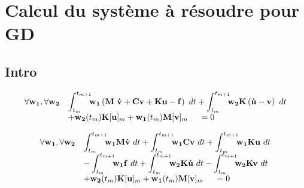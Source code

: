 \documentclass[12pt,a4paper]{report}
\begin{document}
\renewcommand{\contentsname}{Sommaire}
\tableofcontents

\chapter{Calcul du système à résoudre pour GD}
\section{Intro}
  
\begin{equation}
\begin{array}{r l}
	\forall \mathbf{w_1},\forall \mathbf{w_2}
	&\displaystyle\int_{t_m}^{t_{m+1}} \!\!\! 	\mathbf{w_1}
		\left(
		\mathbf{M}~\mathbf{\dot{v}} 
			+ \mathbf{C}\mathbf{v} 
			+ \mathbf{K}\mathbf{u}
			- \mathbf{f}
		\right)~dt
	  +\displaystyle\int_{t_m}^{t_{m+1}} \!\!\! 	\mathbf{w_2}
		\mathbf{K} 
			\left( \mathbf{\dot{u}} - \mathbf{v} 
			\right) ~dt
	\\
	  &+ \mathbf{w_2}(t_m) \mathbf{K}[\mathbf{u}]_m
	   +  \mathbf{w_1}(t_m) \mathbf{M}[\mathbf{v}]_m
	~~~~=0
\end{array}
\end{equation}


\begin{equation}
\begin{array}{r l}
	\forall \mathbf{w_1},\forall \mathbf{w_2}
	&\displaystyle
	 \int_{t_m}^{t_{m+1}} \!\!\! 	\mathbf{w_1}
		\mathbf{M}\mathbf{\dot{v}} ~dt
	 +\int_{t_m}^{t_{m+1}} \!\!\! 	\mathbf{w_1}
		\mathbf{C}\mathbf{v} ~dt
	 +\int_{t_m}^{t_{m+1}} \!\!\! 	\mathbf{w_1}
		\mathbf{K}\mathbf{u} ~dt
	\\
	  &\displaystyle
	   - \int_{t_m}^{t_{m+1}} \!\!\! 	\mathbf{w_1}
			\mathbf{f} ~dt		
	   + \int_{t_m}^{t_{m+1}} \!\!\! 
	    	\mathbf{w_2} \mathbf{K}\mathbf{\dot{u}}~dt 
	    -\int_{t_m}^{t_{m+1}} \!\!\! 
	    	\mathbf{w_2} \mathbf{K}     \mathbf{v} ~dt
	\\
	  &+ \mathbf{w_2}(t_m) \mathbf{K}[\mathbf{u}]_m
	   +  \mathbf{w_1}(t_m) \mathbf{M}[\mathbf{v}]_m
	~~~~=0
\end{array}
\end{equation}
\end{document}
